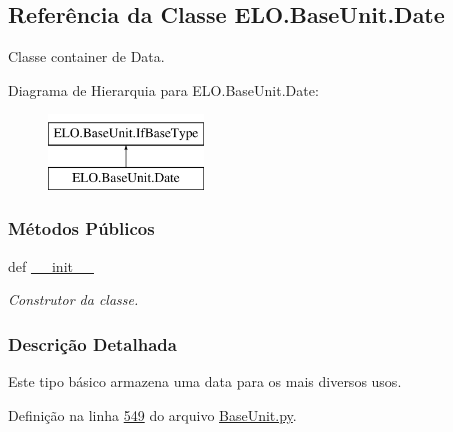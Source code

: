 \hypertarget{classELO_1_1BaseUnit_1_1Date}{\subsection{Referência da Classe E\-L\-O.\-Base\-Unit.\-Date}
\label{classELO_1_1BaseUnit_1_1Date}
}


Classe container de Data.  


Diagrama de Hierarquia para E\-L\-O.\-Base\-Unit.\-Date\-:\begin{figure}[H]
\begin{center}
\leavevmode
\includegraphics[height=2.000000cm]{d2/d74/classELO_1_1BaseUnit_1_1Date}
\end{center}
\end{figure}
\subsubsection*{Métodos Públicos}
\begin{DoxyCompactItemize}
\item 
def \hyperlink{classELO_1_1BaseUnit_1_1Date_a97d924fa5f1b2a1d8afbdbfe17b6a852}{\-\_\-\-\_\-init\-\_\-\-\_\-}
\begin{DoxyCompactList}\small\item\em Construtor da classe. \end{DoxyCompactList}\end{DoxyCompactItemize}


\subsubsection{Descrição Detalhada}
Este tipo básico armazena uma data para os mais diversos usos. 

Definição na linha \hyperlink{BaseUnit_8py_source_l00549}{549} do arquivo \hyperlink{BaseUnit_8py_source}{Base\-Unit.\-py}.



